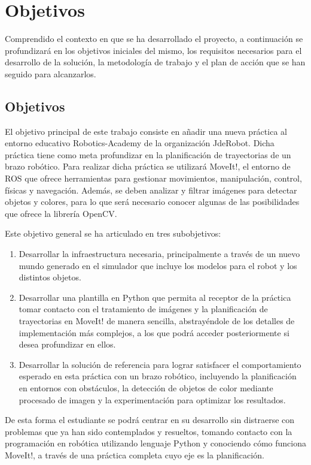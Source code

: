 \documentclass[12pt,spanish,chapterprefix, numbers=noenddot]{book}
\numberwithin{equation}{section}
\numberwithin{figure}{section}
\begin{document}
\chapter{Objetivos}
Comprendido el contexto en que se ha desarrollado el proyecto, a continuación se
profundizará en los objetivos iniciales del mismo, los requisitos necesarios para el desarrollo de la solución, la metodología de trabajo y el plan de acción que se han seguido para alcanzarlos. 

\section{Objetivos}
El objetivo principal de este trabajo consiste en añadir una nueva práctica al entorno educativo Robotics-Academy de la organización JdeRobot. Dicha práctica tiene como meta profundizar en la planificación de trayectorias de un brazo robótico. Para realizar dicha práctica se utilizará MoveIt!, el entorno de ROS que ofrece herramientas para gestionar movimientos, manipulación, control, físicas y navegación. Además, se deben analizar y filtrar imágenes para detectar objetos y colores, para lo que será necesario conocer algunas de las posibilidades que ofrece la librería OpenCV. 

Este objetivo general se ha articulado en tres subobjetivos: 

\begin{enumerate}
    \item Desarrollar la infraestructura necesaria, principalmente a través de un nuevo mundo generado en el simulador que incluye los modelos para el robot y los distintos objetos.
    \item Desarrollar una plantilla en Python que permita al receptor de la práctica tomar contacto con el tratamiento de imágenes y la planificación de trayectorias en MoveIt! de manera sencilla, abstrayéndole de los detalles de implementación más complejos, a los que podrá acceder posteriormente si desea profundizar en ellos.
    \item Desarrollar la solución de referencia para lograr satisfacer el comportamiento esperado en esta práctica con un brazo robótico, incluyendo la planificación en entornos con obstáculos, la detección de objetos de color mediante procesado de imagen y la experimentación para optimizar los resultados.
\end{enumerate}

De esta forma el estudiante se podrá centrar en su desarrollo sin distraerse con problemas que ya han sido contemplados y resueltos, tomando contacto con la programación en robótica utilizando lenguaje Python y conociendo cómo funciona MoveIt!, a través de una práctica completa cuyo eje es la planificación.
\end{document}

